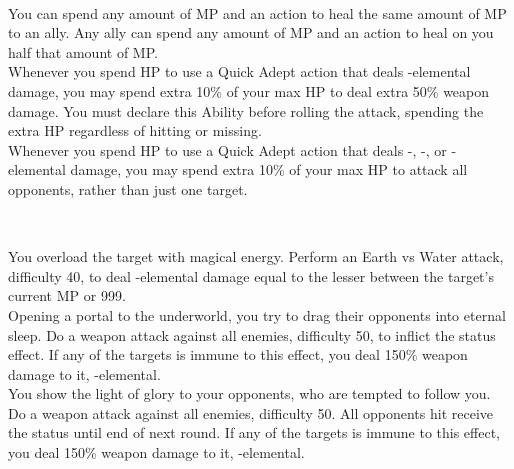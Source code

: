 \begin{tabjob}
    \tabjobsep%

    \\
    \tabjobspec{}

         You can spend any amount of MP and an action to heal the same amount of MP to an ally. Any ally can spend any amount of MP and an action to heal on you half that amount of MP\@. \\

         Whenever you spend HP to use a Quick Adept action that deals -elemental damage, you may spend extra 10\% of your max HP to deal extra 50\% weapon damage. You must declare this Ability before rolling the attack, spending the extra HP regardless of hitting or missing. \\

         Whenever you spend HP to use a Quick Adept action that deals -, -, or -elemental damage, you may spend extra 10\% of your max HP to attack all opponents, rather than just one target. \\

    \tabjobsep%

     \\
    \tabjobspec{}

         You overload the target with magical energy. Perform an Earth vs Water attack, difficulty 40, to deal -elemental damage equal to the lesser between the target's current MP or 999. \\

         Opening a portal to the underworld, you try to drag their opponents into eternal sleep. Do a weapon attack against all enemies, difficulty 50, to inflict the  status effect. If any of the targets is immune to this effect, you deal 150\% weapon damage to it, -elemental. \\
        
         You show the light of glory to your opponents, who are tempted to follow you. Do a weapon attack against all enemies, difficulty 50. All opponents hit receive the  status until end of next round. If any of the targets is immune to this effect, you deal 150\% weapon damage to it, -elemental. \\

\end{tabjob}
\begin{center}
\end{center}
